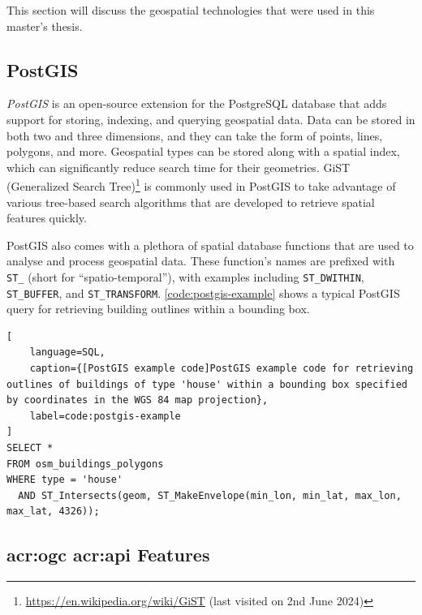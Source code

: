 This section will discuss the geospatial technologies that were used in this master's thesis.

\subsection{PostGIS}
\label{subsec:postgis}

\textit{PostGIS} \citep{PostGIS2001} is an open-source extension for the PostgreSQL database that adds support for storing, indexing, and querying geospatial data. Data can be stored in both two and three dimensions, and they can take the form of points, lines, polygons, and more. Geospatial types can be stored along with a spatial index, which can significantly reduce search time for their geometries. GiST (Generalized Search Tree)\footnote{\url{https://en.wikipedia.org/wiki/GiST} (last visited on 2nd June 2024)} is commonly used in PostGIS to take advantage of various tree-based search algorithms that are developed to retrieve spatial features quickly.

PostGIS also comes with a plethora of spatial database functions that are used to analyse and process geospatial data. These function's names are prefixed with \texttt{ST\_} (short for \enquote{spatio-temporal}), with examples including \texttt{ST\_DWITHIN}, \texttt{ST\_BUFFER}, and \texttt{ST\_TRANSFORM}. \autoref{code:postgis-example} shows a typical PostGIS query for retrieving building outlines within a bounding box.

\begin{lstlisting}[
    language=SQL,
    caption={[PostGIS example code]PostGIS example code for retrieving outlines of buildings of type 'house' within a bounding box specified by coordinates in the WGS 84 map projection},
    label=code:postgis-example
]
SELECT * 
FROM osm_buildings_polygons 
WHERE type = 'house' 
  AND ST_Intersects(geom, ST_MakeEnvelope(min_lon, min_lat, max_lon, max_lat, 4326));
\end{lstlisting}

\subsection[OGC API Features]{\acrshort{acr:ogc} \acrshort{acr:api} Features}
\label{subsec:ogc-api-features}

